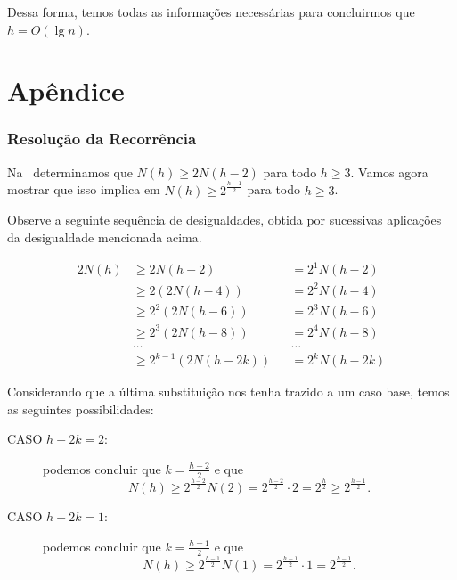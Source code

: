 \documentclass[10pt,a4paper,twoside]{article}
\theoremstyle{definition}
\begin{document}
     Dessa forma, temos todas as informações necessárias para concluirmos que \( h = O(\lg n) \).

  \part*{Apêndice}

    \section{Resolução da Recorrência}

     Na~ determinamos que \( N(h) \geq 2N(h-2) \) para todo \( h \geq 3 \). Vamos agora mostrar que isso implica em \( N(h) \geq 2^{\frac{h-1}{2}} \) para todo \( h \geq 3 \).

     Observe a seguinte sequência de desigualdades, obtida por sucessivas aplicações da desigualdade mencionada acima.

     \begin{alignat*}{2}
       N(h) & \geq 2N(h-2)           &  & = 2^1 N(h-2)  \\
            & \geq 2(2N(h-4))        &  & = 2^2 N(h-4)  \\
            & \geq 2^2(2N(h-6))      &  & = 2^3 N(h-6)  \\
            & \geq 2^3(2N(h-8))      &  & = 2^4 N(h-8)  \\
            & \dots                  &  & \dots         \\
            & \geq 2^{k-1}(2N(h-2k)) &  & = 2^k N(h-2k)
     \end{alignat*}

     Considerando que a última substituição nos tenha trazido a um caso base, temos as seguintes possibilidades:

     \begin{description}
       \item[CASO \( h-2k = 2 \):] podemos concluir que \( k = \frac{h-2}{2} \) e que \[ N(h) \geq 2^{\frac{h-2}{2}} N(2) = 2^{\frac{h-2}{2}} \cdot 2 = 2^{\frac{h}{2}} \geq 2^{\frac{h-1}{2}}. \]
       \item[CASO \( h-2k = 1 \):] podemos concluir que \( k = \frac{h-1}{2} \) e que \[ N(h) \geq 2^{\frac{h-1}{2}} N(1) = 2^{\frac{h-1}{2}} \cdot 1 = 2^{\frac{h-1}{2}}. \]
     \end{description}

     \printbibliography
\end{document}

